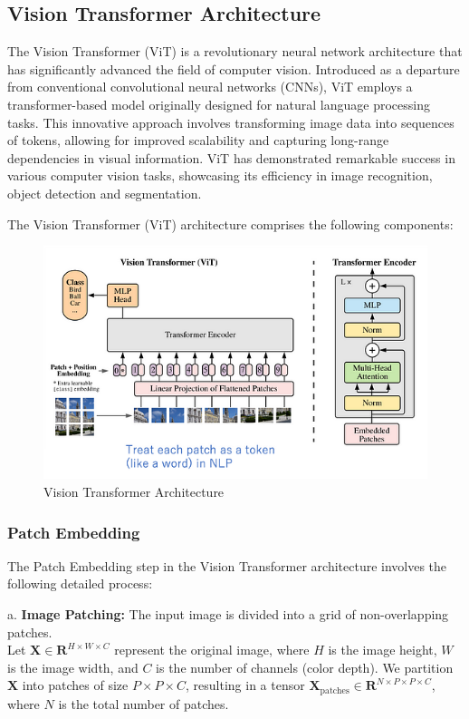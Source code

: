 \subsection{Vision Transformer Architecture}

The Vision Transformer (ViT) is a revolutionary neural network architecture that has significantly advanced the field of computer vision. Introduced as a departure from conventional convolutional neural networks (CNNs), ViT employs a transformer-based model originally designed for natural language processing tasks. This innovative approach involves transforming image data into sequences of tokens, allowing for improved scalability and capturing long-range dependencies in visual information. ViT has demonstrated remarkable success in various computer vision tasks, showcasing its efficiency in image recognition, object detection and segmentation.

\noindent The Vision Transformer (ViT) architecture comprises the following components:

\begin{figure}[htbp]
    \centering
    \includegraphics[width=6in]{img/visiontransformer.png}
    \caption{{Vision Transformer Architecture}}
\end{figure}

\item
\subsubsection{Patch Embedding}
The Patch Embedding step in the Vision Transformer architecture involves the following detailed process:


\noindent a. \textbf{Image Patching:} The input image is divided into a grid of non-overlapping patches.\\
Let $\mathbf{X} \in \mathbf{R}^{H \times W \times C}$ represent the original image, where $H$ is the image height, $W$ is the image width, and $C$ is the number of channels (color depth). We partition $\mathbf{X}$ into patches of size $P \times P \times C$, resulting in a tensor $\mathbf{X}_\text{patches} \in \mathbf{R}^{N \times P \times P \times C}$, where $N$ is the total number of patches.

